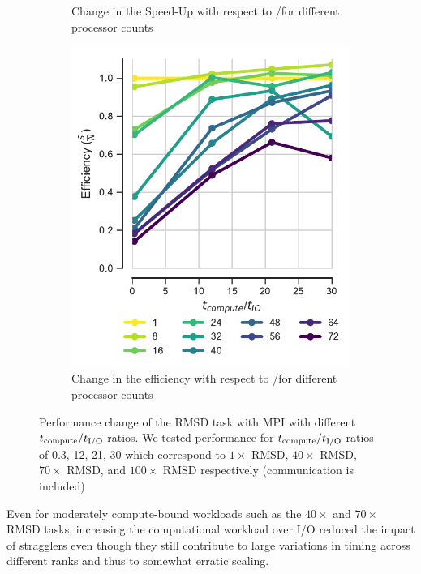 \begin{figure}[ht!]
\begin{subfigure}{.3\textwidth}
  \caption{Change in the Speed-Up with respect to \tcomp/\tIO for different processor counts}
  \label{fig:S2_tcomp_tIO_effect}
\end{subfigure}
\hfill
\begin{subfigure}{.3\textwidth}
  \includegraphics[width=\linewidth]{figures/Compute_to_IO_ratio_on_performance_2d_3_v17.pdf}
  \caption{Change in the efficiency with respect to \tcomp/\tIO for different processor counts}
  \label{fig:E_tcomp_tIO_effect}
\end{subfigure}
%
\caption{Performance change of the RMSD task with MPI with different ${t}_{\text{compute}}/{t}_{\text{I/O}}$ ratios. We tested performance for ${t}_{\text{compute}}/{t}_{\text{I/O}}$ ratios of 0.3, 12, 21, 30
which correspond to $1\times$ RMSD, $40\times$ RMSD, $70\times$ RMSD, and $100\times$ RMSD respectively (communication is included)}
\label{fig:tcomp_tIO_effect}
\end{figure}

Even for moderately compute-bound workloads such
as the $40\times$ and $70\times$ RMSD tasks, increasing the computational workload over I/O reduced the impact of stragglers even
though they still contribute to large variations in timing across different ranks and thus to somewhat erratic scaling. 

